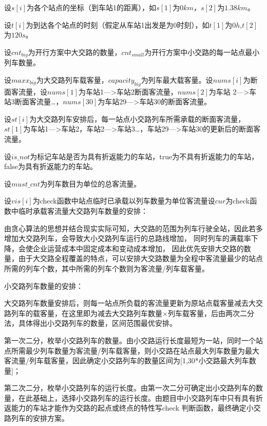 \documentclass[UTF8]{ctexart}
\begin{document}
设$s\left[ i \right]$为各个站点的坐标（到车站1的距离），如$s\left[ 1 \right] $为$0km$，$s\left[ 2 \right] $为$1.38km$。\par
设$t\left[ i \right]$为到达各个站点的时刻（假定从车站1出发是为0时刻），如$t\left[ 1 \right] $为$0h$,$t\left[ 2 \right] $为$120s$。\par
设$cnt_{big}$为开行方案中大交路的数量，$cnt_{small}$为开行方案中小交路的每一站点最小列车数量。\par
设$maxx_{big}$为大交路列车载客量，$capacity_{big}$为列车最大载客量。设$nums\left[ i \right]$为断面客流量，设$nums\left[ 1 \right]$为车站1—>车站2断面客流量，$nums\left[ 2 \right]$为车站 2—>车站3断面客流量…，$nums\left[ 30 \right]$为车站29—>车站30的断面客流量。\par
设$st\left[ i \right]$为大交路列车安排后，每一站点小交路列车所需承载的断面客流量，$st\left[ 1 \right]$为车站1—>车站2，车站2—>车站3…，车站29—>车站30的更新后的断面客流量。\par
设$is\_not$为标记车站是否为具有折返能力的车站，true为不具有折返能力的车站，false为具有折返能力的车站。\par
设$must\_cnt$为列车数目为单位的总客流量。\par
设$vis\left[ i \right]$为check函数中站点临时已承载以列车数量为单位客流量设$cur$为check函数中临时承载客流量大交路列车数量的安排：\par
由贪心算法的思想并结合现实实际可知，大交路的范围为列车行驶全站，因此若多增加大交路列车，会导致大小交路列车运行的总路线增加， 同时列车的满载率下降，会使企业运营成本中固定成本和变动成本增加， 因此优先安排大交路的数量，由于大交路全程覆盖的特点，可以安排大交路数量为全程中客流量最少的站点所需的列车个数，其中所需的列车个数则为客流量/列车载客量。\par
小交路列车数量的安排：\par
大交路列车数量安排后，则每一站点所负载的客流量更新为原站点载客量减去大交路列车的载客量，在这里即为减去大交路列车数量$\times $列车载客量，后由两次二分法，具体得出小交路列车的数量，区间范围最优安排。\par
第一次二分，枚举小交路列车的数量。由小交路运行长度最短为一站，同时一个站点所需最少列车数量为客流量/列车载客量，则小交路在站点最大列车数量为最大客流量/列车载客量，因此确定小交路列车的数量区间为[1,30*小交路最大列车数量]；\par
第二次二分，枚举小交路列车的运行长度。由第一次二分可确定出小交路列车的数量，在此基础上，选择小交路列车的运行长度。由题目中小交路列车中只有具有折返能力的车站才能作为交路的起点或终点的特性写check 判断函数，最终确定小交路列车的安排方案。\par
\end{document}
